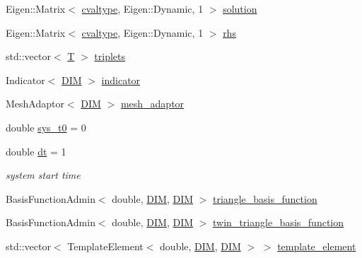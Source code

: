 \begin{DoxyCompactItemize}
\item 
Eigen\+::\+Matrix$<$ \mbox{\hyperlink{complex__edge___t_h_f_e_m_2emdefs_8h_a97d2dbb382a9b25c16c04fc1e1baacdb}{cvaltype}}, Eigen\+::\+Dynamic, 1 $>$ \mbox{\hyperlink{classui_experiment_aaf0657e489f16f47ecf61b4bc0051648}{solution}}
\item 
Eigen\+::\+Matrix$<$ \mbox{\hyperlink{complex__edge___t_h_f_e_m_2emdefs_8h_a97d2dbb382a9b25c16c04fc1e1baacdb}{cvaltype}}, Eigen\+::\+Dynamic, 1 $>$ \mbox{\hyperlink{classui_experiment_a0d42caa6e050d49531d7d006efbef6a8}{rhs}}
\item 
std\+::vector$<$ \mbox{\hyperlink{complex__edge___t_h_f_e_m_2uiexp_8h_a8014ab9a69eccab08613f4642bbbddd5}{T}} $>$ \mbox{\hyperlink{classui_experiment_adc77b528327a0ac71f395005b2008568}{triplets}}
\item 
Indicator$<$ \mbox{\hyperlink{complex__node___t_h_f_e_m_2uiexp_8h_a589b8b9bfdf714f736059845d568b597}{D\+IM}} $>$ \mbox{\hyperlink{classui_experiment_a8400becec774a3accdec7f0e7a102cbd}{indicator}}
\item 
Mesh\+Adaptor$<$ \mbox{\hyperlink{complex__node___t_h_f_e_m_2uiexp_8h_a589b8b9bfdf714f736059845d568b597}{D\+IM}} $>$ \mbox{\hyperlink{classui_experiment_a3043c4d1d53dc7026d83398b7caa2010}{mesh\+\_\+adaptor}}
\item 
double \mbox{\hyperlink{classui_experiment_ab2f282868b75fb348ac4c99d2d84441e}{sys\+\_\+t0}} = 0
\item 
double \mbox{\hyperlink{classui_experiment_a636bedd4cd6e21255631fbaa556427f2}{dt}} = 1
\begin{DoxyCompactList}\small\item\em system start time \end{DoxyCompactList}\item 
Basis\+Function\+Admin$<$ double, \mbox{\hyperlink{complex__node___t_h_f_e_m_2uiexp_8h_a589b8b9bfdf714f736059845d568b597}{D\+IM}}, \mbox{\hyperlink{complex__node___t_h_f_e_m_2uiexp_8h_a589b8b9bfdf714f736059845d568b597}{D\+IM}} $>$ \mbox{\hyperlink{classui_experiment_a9877c48b948d57a73663d4b3a741d6ae}{triangle\+\_\+basis\+\_\+function}}
\item 
Basis\+Function\+Admin$<$ double, \mbox{\hyperlink{complex__node___t_h_f_e_m_2uiexp_8h_a589b8b9bfdf714f736059845d568b597}{D\+IM}}, \mbox{\hyperlink{complex__node___t_h_f_e_m_2uiexp_8h_a589b8b9bfdf714f736059845d568b597}{D\+IM}} $>$ \mbox{\hyperlink{classui_experiment_a20934ca922429d4b15fb94830a1475f1}{twin\+\_\+triangle\+\_\+basis\+\_\+function}}
\item 
std\+::vector$<$ Template\+Element$<$ double, \mbox{\hyperlink{complex__node___t_h_f_e_m_2uiexp_8h_a589b8b9bfdf714f736059845d568b597}{D\+IM}}, \mbox{\hyperlink{complex__node___t_h_f_e_m_2uiexp_8h_a589b8b9bfdf714f736059845d568b597}{D\+IM}} $>$ $>$ \mbox{\hyperlink{classui_experiment_a7706058764736bd2091122372d448c78}{template\+\_\+element}}

\end{DoxyCompactItemize}
